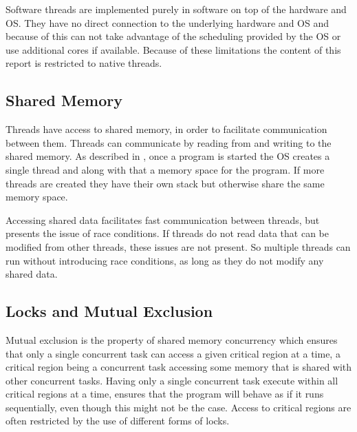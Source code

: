 Software threads are implemented purely in software on top of the hardware and \ac{OS}. They have no direct connection to the underlying hardware and \ac{OS} and because of this can not take advantage of the scheduling provided by the \ac{OS} or use additional cores if available. Because of these limitations the content of this report is restricted to native threads.

\subsection{Shared Memory}\label{sub:sec:shared_memory}
Threads have access to shared memory, in order to facilitate communication between them\cite[p. 93]{tanenbaum2008modern}. Threads can communicate by reading from and writing to the shared memory. As described in , once a program is started the \ac{OS} creates a single thread and along with that a memory space for the program. If more threads are created they have their own stack but otherwise share the same memory space.

Accessing shared data facilitates fast communication between threads, but presents the issue of race conditions. If threads do not read data that can be modified from other threads, these issues are not present. So multiple threads can run without introducing race conditions, as long as they do not modify any shared data. 


\subsection{Locks and Mutual Exclusion}\label{sec:locks_me}
Mutual exclusion is the property of shared memory concurrency which ensures that only a single concurrent task can access a given critical region at a time\cite[p. 117]{tanenbaum2008modern}\cite[p. 962]{bryant2011computer}, a critical region being a concurrent task accessing some memory that is shared with other concurrent tasks\cite[p. 117]{tanenbaum2008modern}\cite[p. 961]{bryant2011computer}. Having only a single concurrent task execute within all critical regions at a time, ensures that the program will behave as if it runs sequentially, even though this might not be the case. Access to critical regions are often restricted by the use of different forms of locks\cite[p. 58]{sutter2005software}. 

